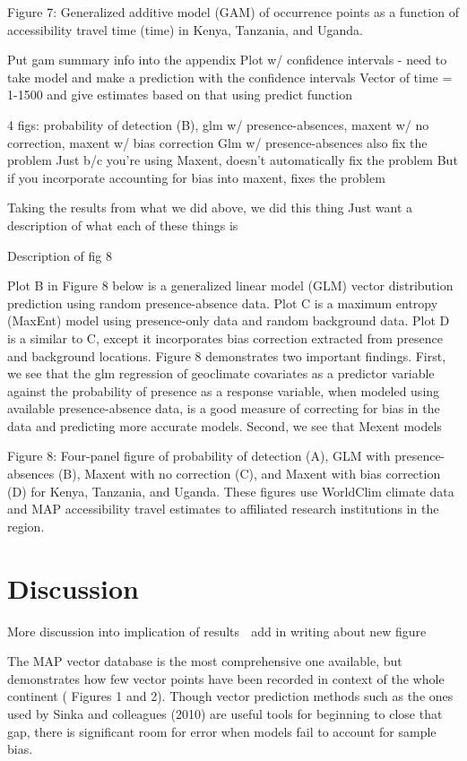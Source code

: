 \documentclass[sn-nature]{sn-jnl}%
\begin{document}
{Figure 7: Generalized additive model (GAM) of occurrence points as a function of accessibility travel time (time) in Kenya, Tanzania, and Uganda.

Put gam summary info into the appendix
Plot w/ confidence intervals - need to take model and make a prediction with the confidence intervals
Vector of time = 1-1500 and give estimates based on that using predict function

4 figs: probability of detection (B), glm w/ presence-absences, maxent w/ no correction, maxent w/ bias correction 
Glm w/ presence-absences also fix the problem
Just b/c you’re using Maxent, doesn’t automatically fix the problem
But if you incorporate accounting for bias into maxent, fixes the problem

Taking the results from what we did above, we did this thing
Just want a description of what each of these things is

Description of fig 8

Plot B in Figure 8 below is a generalized linear model (GLM) vector distribution prediction using random presence-absence data. Plot C is a maximum entropy (MaxEnt) model using presence-only data and random background data. Plot D is a similar to C, except it incorporates bias correction extracted from presence and background locations. Figure 8 demonstrates two important findings. First, we see that the glm regression of geoclimate covariates as a predictor variable against the probability of presence as a response variable, when modeled using available presence-absence data, is a good measure of correcting for bias in the data and predicting more accurate models. Second, we see that Mexent models 



Figure 8: Four-panel figure of probability of detection (A), GLM with presence-absences (B), Maxent with no correction (C), and Maxent with bias correction (D) for Kenya, Tanzania, and Uganda. These figures use WorldClim climate data and MAP accessibility travel estimates to affiliated research institutions in the region. 


\section{Discussion}\label{discussion}
More discussion into implication of results ^^^ add in writing about new figure

The MAP vector database is the most comprehensive one available, but demonstrates how few vector points have been recorded in context of the whole continent ( Figures 1 and 2). Though vector prediction methods such as the ones used by Sinka and colleagues (2010) are useful tools for beginning to close that gap, there is significant room for error when models fail to account for sample bias.

}
\end{document}
